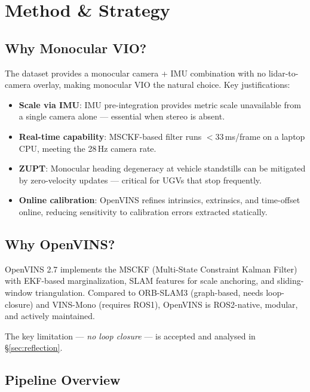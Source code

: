 \documentclass[10pt,a4paper]{article}
\begin{document}
\section{Method \& Strategy}

\subsection{Why Monocular VIO?}

The dataset provides a monocular camera + IMU combination with no lidar-to-camera overlay,
making monocular VIO the natural choice. Key justifications:

\begin{itemize}[nosep]
  \item \textbf{Scale via IMU}: IMU pre-integration provides metric scale unavailable from a
    single camera alone --- essential when stereo is absent.
  \item \textbf{Real-time capability}: MSCKF-based filter runs $<$33\,ms/frame on a laptop CPU,
    meeting the 28\,Hz camera rate.
  \item \textbf{ZUPT}: Monocular heading degeneracy at vehicle standstills can be mitigated
    by zero-velocity updates --- critical for UGVs that stop frequently.
  \item \textbf{Online calibration}: OpenVINS refines intrinsics, extrinsics, and
    time-offset online, reducing sensitivity to calibration errors extracted statically.
\end{itemize}

\subsection{Why OpenVINS?}

OpenVINS 2.7 implements the MSCKF (Multi-State Constraint Kalman Filter)
with EKF-based marginalization, SLAM features for scale anchoring, and sliding-window
triangulation. Compared to ORB-SLAM3 (graph-based, needs loop-closure) and VINS-Mono
(requires ROS1), OpenVINS is ROS2-native, modular, and actively maintained.

The key limitation --- \textit{no loop closure} --- is accepted and analysed in \S\ref{sec:reflection}.

\subsection{Pipeline Overview}
\end{document}
